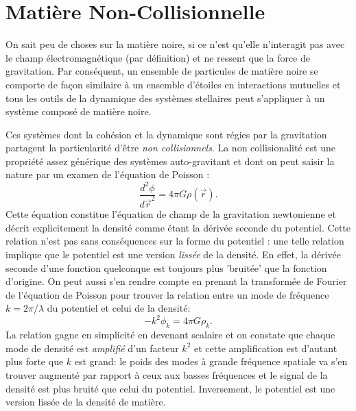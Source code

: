 \section{Matière Non-Collisionnelle}
On sait peu de choses sur la matière noire, si ce n'est qu'elle n'interagit pas avec le champ électromagnétique (par définition) et ne ressent que la force de gravitation. Par conséquent, un ensemble de particules de matière noire se comporte de façon similaire à un ensemble d'étoiles en interactions mutuelles et tous les outils de la dynamique des systèmes stellaires peut s'appliquer à un système composé de matière noire.

Ces systèmes dont la cohésion et la dynamique sont régies par la gravitation partagent la particularité d'être \textit{non collisionnels}. La non collisionalité est une propriété assez générique des systèmes auto-gravitant  et dont on peut saisir la nature par un examen de l'équation de Poisson  :
\begin{equation}
\frac{d^2\phi}{d\vec{r}^2}=4\pi G\rho(\vec{r}).
\end{equation} 
Cette équation constitue l'équation de champ de la gravitation newtonienne et décrit explicitement la densité comme étant la dérivée seconde du potentiel. Cette relation n'est pas sans conséquences sur la forme du potentiel : une telle relation implique que le potentiel est une version \textit{lissée} de la densité. En effet, la dérivée seconde d'une fonction quelconque est toujours plus 'bruitée' que la fonction d'origine. On peut aussi s'en rendre compte en prenant la transformée de Fourier de l'équation de Poisson pour trouver la relation entre un mode de fréquence $k=2\pi/\lambda$ du potentiel et celui de la densité:
\begin{equation}
-k^2 \phi_k=4\pi G \rho_k.
\end{equation}
La relation gagne en simplicité en devenant scalaire et on constate que chaque mode de densité est \textit{amplifié} d'un facteur $k^2$ et cette amplification est d'autant plus forte que $k$ est grand: le poids des modes à grande fréquence spatiale va s'en trouver augmenté par rapport à ceux aux basses fréquences et le signal de la densité est plus bruité que celui du potentiel. Inversement, le potentiel est une version lissée de la densité de matière.
